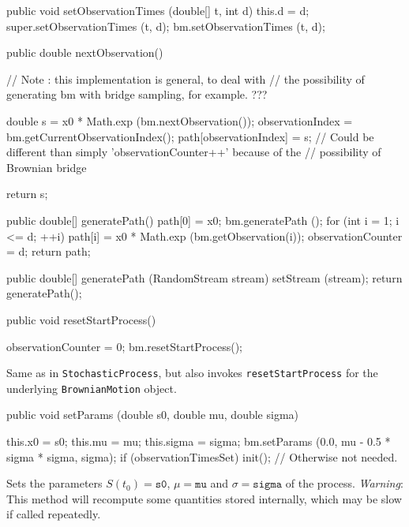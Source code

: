 \begin{code}\begin{hide}
   public void setObservationTimes (double[] t, int d) {
        this.d = d;
        super.setObservationTimes (t, d);
        bm.setObservationTimes (t, d);
    }

   public double nextObservation() {
        // Note : this implementation is general, to deal with
        // the possibility of generating bm with bridge sampling, for example.  ???

        double s = x0 * Math.exp (bm.nextObservation());
        observationIndex = bm.getCurrentObservationIndex();
        path[observationIndex] = s;
        // Could be different than simply 'observationCounter++' because of the
        // possibility of Brownian bridge

        return s;
    }

   public double[] generatePath() {
        path[0] = x0;
        bm.generatePath ();
        for (int i = 1; i <= d; ++i)
            path[i] = x0 * Math.exp (bm.getObservation(i));
        observationCounter = d;
        return path;
    }

   public double[] generatePath (RandomStream stream) {
        setStream (stream);
        return generatePath();
    }\end{hide}

   public void resetStartProcess() \begin{hide} {
        observationCounter = 0;
        bm.resetStartProcess();
    }\end{hide}
\end{code}
\begin{tabb} Same as in \texttt{StochasticProcess}, but also invokes
\texttt{resetStartProcess} for the underlying \texttt{BrownianMotion} object.
\end{tabb}
\begin{code}

   public void setParams (double s0, double mu, double sigma) \begin{hide} {
        this.x0    = s0;
        this.mu    = mu;
        this.sigma = sigma;
        bm.setParams (0.0, mu - 0.5 * sigma * sigma, sigma);
        if (observationTimesSet) init(); // Otherwise not needed.
    }\end{hide}
\end{code}
\begin{tabb}
Sets the parameters $S(t_{0}) = \texttt{s0}$, $\mu = \texttt{mu}$ and
$\sigma = \texttt{sigma}$ of the process.
\emph{Warning}: This method will recompute some quantities stored internally,
which may be slow if called repeatedly.
\end{tabb}
